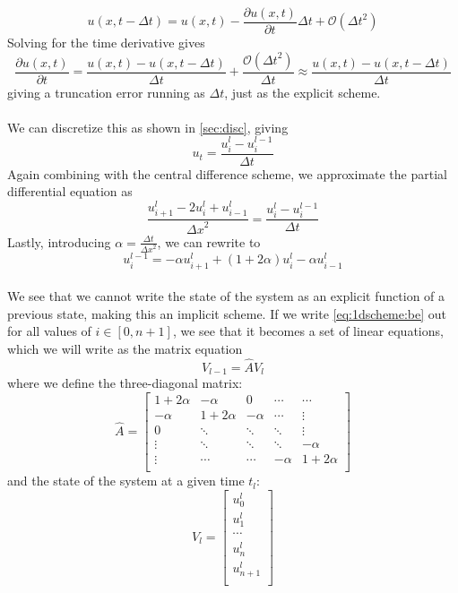 \documentclass[10pt,a4paper]{article}
\newcommand{\bigO}{{\mathcal{O}}}
\newcommand{\dt}{{\Delta t}}
\newcommand{\dx}{{\Delta x}}
\newcommand{\pt}{{\partial t}}
\newcommand{\pu}{{\partial u}}
\begin{document}
\begin{equation}
u(x,t-\dt) = u(x,t) - \frac{\pu(x,t)}{\pt}\dt + \bigO(\dt^2)
\end{equation}
Solving for the time derivative gives
\begin{equation}
\frac{\pu(x,t)}{\pt} = \frac{u(x,t) - u(x,t-\dt)}{\dt} + \frac{\bigO(\dt^2)}{\dt} \approx \frac{u(x,t) - u(x,t-\dt)}{\dt}
\end{equation}
giving a truncation error running as $\dt$, just as the explicit scheme.
\\\\
We can discretize this as shown in \ref{sec:disc}, giving
\begin{equation}
u_t = \frac{u_i^l - u_i^{l-1}}{\dt}
\end{equation}
Again combining with the central difference scheme, we approximate the partial differential equation as
\begin{equation}
\frac{u_{i+1}^l - 2u_i^l+u_{i-1}^l}{\dx^2} = \frac{u_i^l - u_i^{l-1}}{\dt}
\end{equation}
Lastly, introducing $\alpha = \frac{\dt}{\dx^2}$, we can rewrite to
\begin{equation}\label{eq:1dscheme:be}
u_i^{l-1} = -\alpha u_{i+1}^l + (1 + 2\alpha )u_i^l - \alpha u_{i-1}^l
\end{equation}
\\
We see that we cannot write the state of the system as an explicit function of a previous state, making this an implicit scheme. If we write \ref{eq:1dscheme:be} out for all values of $i \in [0,n+1]$, we see that it becomes a set of linear equations, which we will write as the matrix equation
\begin{equation}\label{eq:be_matrix}
V_{l-1} = \hat{A}V_l
\end{equation}
where we define the three-diagonal matrix:
\begin{equation}
\hat{A} = \begin{bmatrix}
1+2\alpha & -\alpha & 0 & \cdots & \cdots \\
-\alpha & 1+2\alpha & -\alpha & \cdots & \vdots \\
0 & \ddots & \ddots & \ddots & \vdots \\
\vdots & \ddots & \ddots & \ddots & -\alpha \\
\vdots & \cdots & \cdots & -\alpha & 1+2\alpha \\
\end{bmatrix}
\end{equation}
and the state of the system at a given time $t_l$:
\begin{equation}\label{eqn:V} V_l = \begin{bmatrix}
u_{0}^l\\
u_{1}^l\\
\cdots\\
u_{n}^l\\
u_{n+1}^l\\
\end{bmatrix}
\end{equation}
\end{document}
